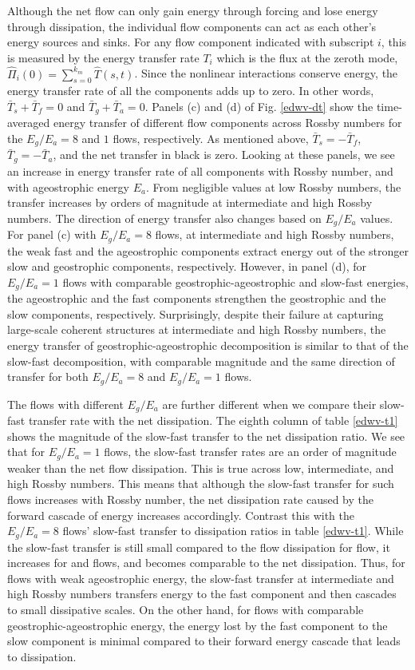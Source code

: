 \documentclass[../Rajarshi-thesis-draft.tex]{subfiles}
\begin{document}
 
Although the net flow can only gain energy through forcing and lose energy through dissipation, the individual flow components can act as each other's energy sources and sinks. For any flow component indicated with subscript $i$, this is measured by the energy transfer rate $T_i$ which is the flux at the zeroth mode, $\hat{\Pi}_i(0) = \sum_{s = 0}^{k_m} \hat{T}(s,t)$.  Since the nonlinear interactions conserve energy, the energy transfer rate of all the components adds up to zero. In other words, $\bar{T}_s + \bar{T}_f=0$ and $\bar{T}_g + \bar{T}_a=0$.  Panels (c) and (d) of Fig. \ref{edwv-dt} show the time-averaged energy transfer of different flow components across Rossby numbers for the $E_g/ E_a=8$ and $1$ flows, respectively. As mentioned above, $\bar{T}_s = - \bar{T}_f$,  $\bar{T}_g = -\bar{T}_a$, and the net transfer in black is zero. Looking at these panels, we see an increase in energy transfer rate of all components with Rossby number, and with ageostrophic energy $E_a$. From negligible values at low Rossby numbers, the transfer increases by orders of magnitude at intermediate and high Rossby numbers. The direction of energy transfer also changes based on $E_g/E_a$ values. For panel (c) with $E_g/E_a = 8$ flows, at intermediate and high Rossby numbers, the weak fast and the ageostrophic components extract energy out of the stronger slow and geostrophic components, respectively. However, in panel (d), for $E_g/E_a = 1$ flows with comparable geostrophic-ageostrophic and slow-fast energies, the ageostrophic and the fast components strengthen the geostrophic and the slow components, respectively. Surprisingly, despite their failure at capturing large-scale coherent structures at intermediate and high Rossby numbers, the energy transfer of geostrophic-ageostrophic decomposition is similar to that of the slow-fast decomposition, with comparable magnitude and the same direction of transfer for both $E_g/E_a =8$ and $E_g/E_a = 1$ flows.

The flows with different $E_g/E_a$ are further different when we compare their slow-fast transfer rate with the net dissipation. The eighth column of table \ref{edwv-t1} shows the magnitude of the slow-fast transfer to the net dissipation ratio. We see that for $E_g/E_a = 1$ flows, the slow-fast transfer rates are an order of magnitude weaker than the net flow dissipation. This is true across low, intermediate, and high Rossby numbers. This means that although the slow-fast transfer for such flows increases with Rossby number, the net dissipation rate caused by the forward cascade of energy increases accordingly. Contrast this with the $E_g/E_a= 8$ flows' slow-fast transfer to dissipation ratios in table \ref{edwv-t1}. While the slow-fast transfer is still small compared to the flow dissipation for \lre flow, it increases for \ire and \hre flows, and becomes comparable to the net dissipation.  Thus, for flows with weak ageostrophic energy, the slow-fast transfer at intermediate and high Rossby numbers transfers energy to the fast component and then cascades to small dissipative scales. On the other hand, for flows with comparable geostrophic-ageostrophic energy, the energy lost by the fast component to the slow component is minimal compared to their forward energy cascade that leads to dissipation. 
\end{document}
